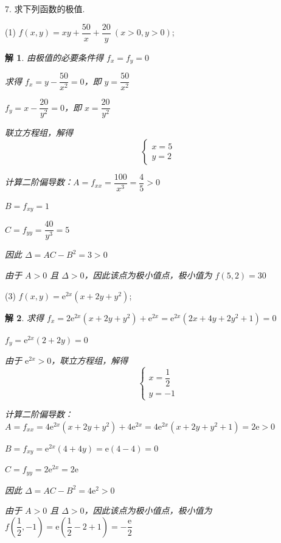 \documentclass[a4paper,12pt]{article}
\newtheorem*{sol}{解}
\begin{document}
7. 求下列函数的极值.

(1) $f(x,y) = xy + \dfrac{50}{x} + \dfrac{20}{y}\ (x>0,y>0)$;
\begin{sol}
    由极值的必要条件得 $f_x=f_y=0$

    求得 $f_x = y - \dfrac{50}{x^2} = 0$，即 $y = \dfrac{50}{x^2}$

    $f_y = x - \dfrac{20}{y^2} = 0$，即 $x = \dfrac{20}{y^2}$

    联立方程组，解得
    $$
        \begin{cases}
            x=5 \\
            y=2
        \end{cases}
    $$

    计算二阶偏导数：$A=f_{xx}=\dfrac{100}{x^3}=\dfrac{4}{5}>0$

    $B = f_{xy} = 1$

    $C = f_{yy} = \dfrac{40}{y^3}=5$

    因此 $\Delta = AC - B^2 = 3 > 0$

    由于 $A>0$ 且 $\Delta>0$，因此该点为极小值点，极小值为 $f(5,2)=30$
\end{sol}

(3) $f(x,y) = \mathrm{e}^{2x}\left(x + 2y + y^2\right)$;
\begin{sol}
    求得 $f_x = 2\mathrm{e}^{2x}(x + 2y + y^2) + \mathrm{e}^{2x} = \mathrm{e}^{2x}(2x + 4y + 2y^2 + 1)=0$

    $f_y = \mathrm{e}^{2x}(2 + 2y)=0$

    由于 $\mathrm{e}^{2x}>0$，联立方程组，解得
    $$
        \begin{cases}
            x=\dfrac{1}{2} \\
            y=-1
        \end{cases}
    $$

    计算二阶偏导数：$A = f_{xx} = 4\mathrm{e}^{2x}(x + 2y + y^2) + 4\mathrm{e}^{2x} = 4\mathrm{e}^{2x}(x + 2y + y^2 + 1)=2\mathrm{e}>0$

    $B = f_{xy} = \mathrm{e}^{2x}(4 + 4y)=\mathrm{e}(4 - 4) = 0$

    $C = f_{yy} = 2\mathrm{e}^{2x}= 2\mathrm{e}$

    因此 $\Delta = AC - B^2 = 4\mathrm{e}^2 > 0$

    由于 $A>0$ 且 $\Delta>0$，因此该点为极小值点，极小值为 $f\left(\dfrac{1}{2}, -1\right) = \mathrm{e}\left(\dfrac{1}{2} - 2 + 1\right) = -\dfrac{\mathrm{e}}{2}$
\end{sol}
\end{document}

